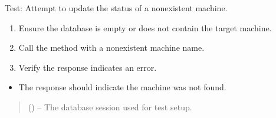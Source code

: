 \documentclass[letterpaper,10pt,english]{sphinxmanual}
\begin{document}

\begin{fulllineitems}
\label{\detokenize{test:test.test_machine.test_update_machine_status_not_found}}
\pysigstartsignatures
\pysiglinewithargsret
{}
{}
{}
\pysigstopsignatures
\sphinxAtStartPar
Test: Attempt to update the status of a non\sphinxhyphen{}existent machine.
\begin{description}
\begin{enumerate}
%
\item {} 
\sphinxAtStartPar
Ensure the database is empty or does not contain the target machine.

\item {} 
\sphinxAtStartPar
Call the  method with a non\sphinxhyphen{}existent machine name.

\item {} 
\sphinxAtStartPar
Verify the response indicates an error.

\end{enumerate}

\begin{itemize}
\item {} 
\sphinxAtStartPar
The response should indicate the machine was not found.

\end{itemize}

\end{description}
\begin{quote}\begin{description}
\sphinxAtStartPar
{} () – The database session used for test setup.

\end{description}\end{quote}

\end{fulllineitems}

\end{document}
